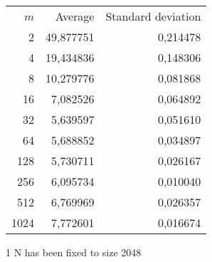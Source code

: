 \begin{tabular}{rrr}\
 $m$ & Average & Standard deviation  \\
2 &  49,877751 &  0,214478 \\ 
4 &  19,434836 &  0,148306 \\ 
8 &  10,279776 &  0,081868 \\ 
16 &  7,082526 &  0,064892 \\ 
32 &  5,639597 &  0,051610 \\ 
64 &  5,688852 &  0,034897 \\ 
128 &  5,730711 &  0,026167 \\ 
256 &  6,095734 &  0,010040 \\ 
512 &  6,769969 &  0,026357 \\ 
1024 &  7,772601 &  0,016674 \\ 
\end{tabular}
\begin{tablenotes}
\item[1] N has been fixed to size 2048
\end{tablenotes}

